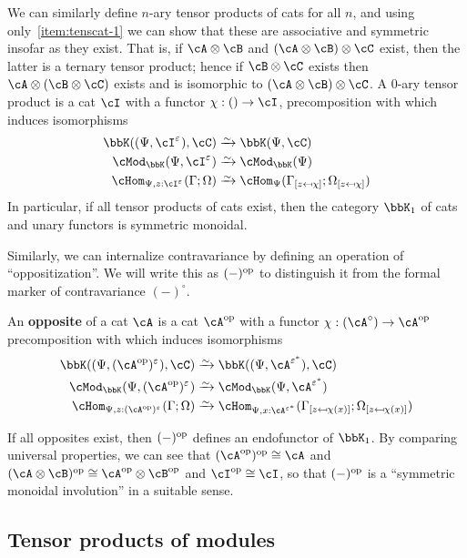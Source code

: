 \documentclass{amsart}
\newcommand{\A}{\cA}
\newcommand{\B}{\cB}
\newcommand{\C}{\cC}
\newcommand{\I}{\cI}
\newcommand{\K}{\bbK}
\let\mod\cMod
\def\modk{\mod_\K}
\renewcommand{\o}{^{\circ}}
\newcommand{\e}[1][]{^{\varepsilon_{#1}}}
\newcommand{\epbar}{^{\varepsilon^*}}
\def\mhomv#1#2#3{\cHom_{#1}(#2;#3)}
\newcommand{\subst}[3]{{#1}_{[#2 \mapsfrom #3]}}
\begin{document}
We can similarly define $n$-ary tensor products of cats for all $n$, and using only~\ref{item:tenscat-1} we can show that these are associative and symmetric insofar as they exist.
That is, if $\A\otimes \B$ and $(\A\otimes \B)\otimes \C$ exist, then the latter is a ternary tensor product; hence if $\B\otimes \C$ exists then $\A\otimes (\B\otimes \C)$ exists and is isomorphic to $(\A\otimes \B)\otimes \C$.
A 0-ary tensor product is a cat $\I$ with a functor $\chi:()\to \I$, precomposition with which induces isomorphisms
\begin{align*}
  \K((\Psi,\I\e),\C) &\toiso \K(\Psi,\C)\\
  \modk(\Psi,\I\e) &\toiso \modk(\Psi)\\
  \mhomv{\Psi,z:\I\e}{\Gamma}{\Omega} &\toiso \mhomv{\Psi}{\subst\Gamma z\chi}{\subst\Omega z \chi}
\end{align*}
In particular, if all tensor products of cats exist, then the category $\K_1$ of cats and unary functors is symmetric monoidal.

Similarly, we can internalize contravariance by defining an operation of ``oppositization''.
We will write this as $(-)^{\mathrm{op}}$ to distinguish it from the formal marker of contravariance $(-)\o$.

\begin{defn}\label{defn:opp-cat}
  An \textbf{opposite} of a cat $\A$ is a cat $\A\op$ with a functor $\chi:(\A\o) \to \A\op$ precomposition with which induces isomorphisms
  \begin{align*}
    \K((\Psi,(\A\op)\e),\C) &\toiso \K((\Psi,\A\epbar),\C)\\
    \modk(\Psi,(\A\op)\e) &\toiso \modk(\Psi,\A\epbar) \\
    \mhomv{\Psi,z:(\A\op)\e}{\Gamma}{\Omega} &\toiso \mhomv{\Psi,x:\A\epbar}{\subst\Gamma z {\chi(x)}}{\subst\Omega z{\chi(x)}}
  \end{align*}
\end{defn}

If all opposites exist, then $(-)^{\mathrm{op}}$ defines an endofunctor of $\K_1$.
By comparing universal properties, we can see that $(\A\op)\op\cong \A$ and $(\A\otimes \B)\op \cong \A\op \otimes \B\op$ and $\I\op\cong \I$, so that $(-)^{\mathrm{op}}$ is a ``symmetric monoidal involution'' in a suitable sense.


\subsection{Tensor products of modules}
\label{sec:tens}
\end{document}
